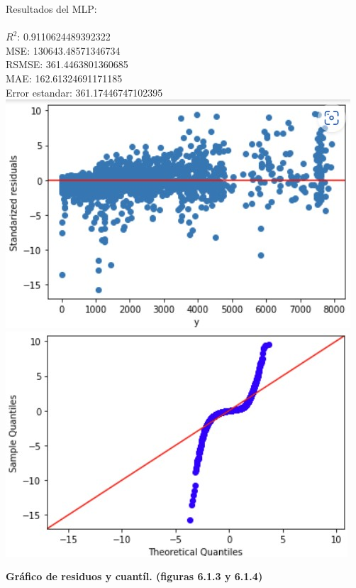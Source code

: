 \documentclass{article}
\begin{document}
            Resultados del MLP:\\
                    \\  
                        $R^2$:  0.9110624489392322 \\
                        MSE:  130643.48571346734 \\
                        RSMSE:  361.4463801360685 \\
                        MAE:  162.61324691171185 \\
                        Error estandar:  361.17446747102395 \\
                
                
                        \includegraphics[scale=0.6]{images/MLP_After_SS.jpg} 
                        \includegraphics[scale=0.6]{images/MLP_After_SS_Q.jpg} \\
                        \begin{center}
                            \textbf{Gráfico de residuos y cuantíl. (figuras 6.1.3 y 6.1.4)}
                        \end{center}
                        
\end{document}
